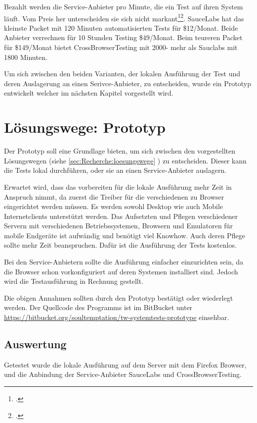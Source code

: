 Bezahlt werden die Service-Anbieter pro Minute, die ein Test auf ihren System läuft. Vom Preis her unterscheiden sie sich nicht markant\footcite{Sauce_Labs_Pricing_2015-07-26}\footcite{Test_your_site_on_all_browsers_2015-07-26}. SauceLabs hat das kleinste Packet mit 120 Minuten automatisierten Tests für \$12/Monat. Beide Anbieter verrechnen für 10 Stunden Testing \$49/Monat. Beim teureren Packet für \$149/Monat bietet CrossBrowserTesting mit 2000- mehr als Sauclabs mit 1800 Minuten.

Um sich zwischen den beiden Varianten, der lokalen Ausführung der Test und deren Auslagerung an einen Serivce-Anbieter, zu entscheiden, wurde ein Prototyp entwickelt welcher im nächsten Kapitel vorgestellt wird.

\section{Lösungswege: Prototyp}
Der Prototyp soll eine Grundlage bieten, um sich zwischen den vorgestellten Lösungswegen (siehe \cref{sec:Recherche:loesungswege} ) zu entscheiden. Dieser kann die Tests lokal durchführen, oder sie an einen Service-Anbieter auslagern.

Erwartet wird, dass das vorbereiten für die lokale Ausführung mehr Zeit in Anspruch nimmt, da zuerst die Treiber für die verschiedenen zu Browser eingerichtet werden müssen. Es werden sowohl Desktop wie auch Mobile Internetclients unterstützt werden. Das Aufsetzten und Pflegen verschiedener Servern mit verschiedenen Betriebssystemen, Browsern und Emulatoren für mobile Endgeräte ist aufwändig und benötigt viel Knowhow. Auch deren Pflege sollte mehr Zeit beanspruchen. Dafür ist die Ausführung der Tests kostenlos.

Bei den Service-Anbietern sollte die Ausführung einfacher einzurichten sein, da die Browser schon vorkonfiguriert auf deren Systemen installiert sind. Jedoch wird die Testausführung in Rechnung gestellt. 

Die obigen Annahmen sollten durch den Prototyp bestätigt oder wiederlegt werden. Der Quellcode des Programms ist im BitBucket unter \url{https://bitbucket.org/soultemptation/tw-systemtests-prototype} einsehbar.

\subsection{Auswertung}
Getestet wurde die lokale Ausführung auf dem Server mit dem Firefox Browser, und die Anbindung der Service-Anbieter SauceLabs und CrossBrowserTesting. 

